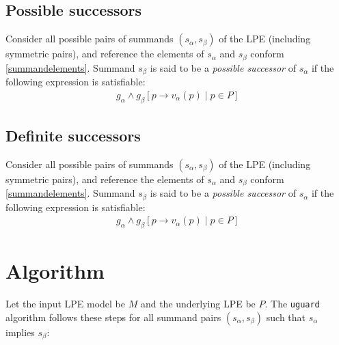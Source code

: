 \subsection{Possible successors}

Consider all possible pairs of summands $(s_\alpha, s_\beta)$ of the LPE (including symmetric pairs), and reference the elements of $s_\alpha$ and $s_\beta$ conform \ref{summandelements}.
Summand $s_\beta$ is said to be a \emph{possible successor} of $s_\alpha$ if the following expression is satisfiable:
\begin{align*}
g_\alpha \land {g_\beta}[p \rightarrow v_\alpha(p) \;|\; p \in P]
\end{align*}

\subsection{Definite successors}

Consider all possible pairs of summands $(s_\alpha, s_\beta)$ of the LPE (including symmetric pairs), and reference the elements of $s_\alpha$ and $s_\beta$ conform \ref{summandelements}.
Summand $s_\beta$ is said to be a \emph{possible successor} of $s_\alpha$ if the following expression is satisfiable:
\begin{align*}
g_\alpha \land {g_\beta}[p \rightarrow v_\alpha(p) \;|\; p \in P]
\end{align*}

\section{Algorithm}

Let the input LPE model be $M$ and the underlying LPE be $P$.
The \texttt{uguard} algorithm follows these steps for all summand pairs $(s_\alpha, s_\beta)$ such that $s_\alpha$ implies $s_\beta$:

